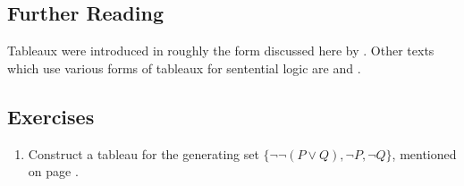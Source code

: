 {\small

\subsection*{Further Reading}

Tableaux were introduced in roughly the form discussed here by \citet{smullyan}. Other texts which use various forms of tableaux for sentential logic are \citealt{bevpospa,bosintlo,hodges,jefforlos,priintncl} and \citealt{smith}.



\subsection*{Exercises} \label{ex:l1tabl}

\begin{enumerate}
\item Construct a tableau for the generating set $\{¬¬(P\vee Q),¬P,¬Q\}$, mentioned on page \pageref{tabl6ex}.


\end{enumerate}}

